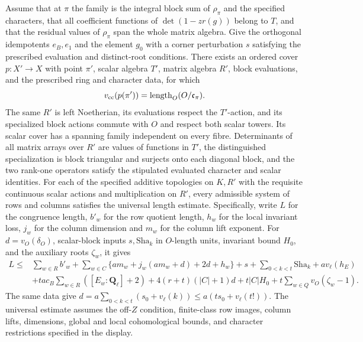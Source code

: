 \begin{formalstatement}\label{pn:P041}
Assume that at \(\pi\) the family is the integral block sum of \(\rho_\pi\) and the specified characters, that all coefficient functions of \(\det(1-zr(g))\) belong to \(T\), and that the residual values of \(\rho_\pi\) span the whole matrix algebra. Give the orthogonal idempotents \(e_B,e_1\) and the element \(g_0\) with a corner perturbation \(s\) satisfying the prescribed evaluation and distinct-root conditions. There exists an ordered cover \(p:X'\to X\) with point \(\pi'\), scalar algebra \(T'\), matrix algebra \(R'\), block evaluations, and the prescribed ring and character data, for which
\[
 v_{\rm cc}(p(\pi'))=\operatorname{length}_O(O/\mathfrak c_\pi).
\]
The same \(R'\) is left Noetherian, its evaluations respect the \(T'\)-action, and its specialized block actions commute with \(O\) and respect both scalar towers. Its scalar cover has a spanning family independent on every fibre. Determinants of all matrix arrays over \(R'\) are values of functions in \(T'\), the distinguished specialization is block triangular and surjects onto each diagonal block, and the two rank-one operators satisfy the stipulated evaluated character and scalar identities. For each of the specified additive topologies on \(K,R'\) with the requisite continuous scalar actions and multiplication on \(R'\), every admissible system of rows and columns satisfies the universal length estimate. Specifically, write \(L\) for the congruence length, \(b'_w\) for the row quotient length, \(h_w\) for the local invariant loss, \(j_w\) for the column dimension and \(m_w\) for the column lift exponent. For \(d=v_O(\delta_O)\), scalar-block inputs \(s,\mathrm{Sha}_k\) in \(O\)-length units, invariant bound \(H_0\), and the auxiliary roots \(\zeta_w\), it gives
\[
\begin{aligned}
 L\le{}&\sum_{w\in R}b'_w+\sum_{w\in C}\{a m_w+j_w(a m_w+d)+2d+h_w\}
       +s+\sum_{0<k<t}\mathrm{Sha}_k+a v_\ell(h_E)\\
 &+ta c_B\sum_{w\in R}([E_w:\mathbf Q_\ell]+2)
     +4(r+t)(|C|+1)d+t|C|H_0+t\sum_{w\in Q}v_O(\zeta_w-1).
\end{aligned}
\]
The same data give \(d=a\sum_{0<k<t}(s_0+v_\ell(k))\le a(t s_0+v_\ell(t!))\). The universal estimate assumes the off-\(Z\) condition, finite-class row images, column lifts, dimensions, global and local cohomological bounds, and character restrictions specified in the display.
\end{formalstatement}
